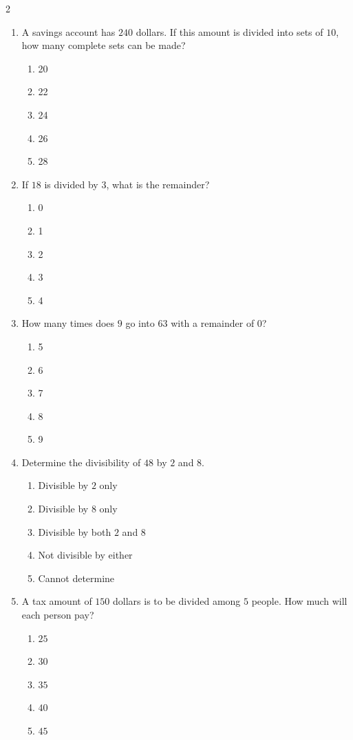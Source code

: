 \documentclass[10pt]{article}
\begin{document}
\begin{multicols}{2}
\begin{enumerate}[label=\textbf{Q\arabic*.}, leftmargin=*, itemsep=6pt, parsep=0pt]
  \item \small A savings account has $240$ dollars. If this amount is divided into sets of $10$, how many complete sets can be made?
  \begin{enumerate}[label=(\Alph*), leftmargin=0.6cm, nosep, itemsep=2pt]
    \item 20
    \item 22
    \item 24
    \item 26
    \item 28
  \end{enumerate}

  \item \small If $18$ is divided by $3$, what is the remainder?
  \begin{enumerate}[label=(\Alph*), leftmargin=0.6cm, nosep, itemsep=2pt]
    \item 0
    \item 1
    \item 2
    \item 3
    \item 4
  \end{enumerate}

  \item \small How many times does $9$ go into $63$ with a remainder of $0$?
  \begin{enumerate}[label=(\Alph*), leftmargin=0.6cm, nosep, itemsep=2pt]
    \item 5
    \item 6
    \item 7
    \item 8
    \item 9
  \end{enumerate}

  \item \small Determine the divisibility of $48$ by $2$ and $8$.
  \begin{enumerate}[label=(\Alph*), leftmargin=0.6cm, nosep, itemsep=2pt]
    \item Divisible by $2$ only
    \item Divisible by $8$ only
    \item Divisible by both $2$ and $8$
    \item Not divisible by either
    \item Cannot determine
  \end{enumerate}

  \item \small A tax amount of $150$ dollars is to be divided among $5$ people. How much will each person pay?
  \begin{enumerate}[label=(\Alph*), leftmargin=0.6cm, nosep, itemsep=2pt]
    \item $25$
    \item $30$
    \item $35$
    \item $40$
    \item $45$
  \end{enumerate}

\end{enumerate}
\end{multicols}
\end{document}
